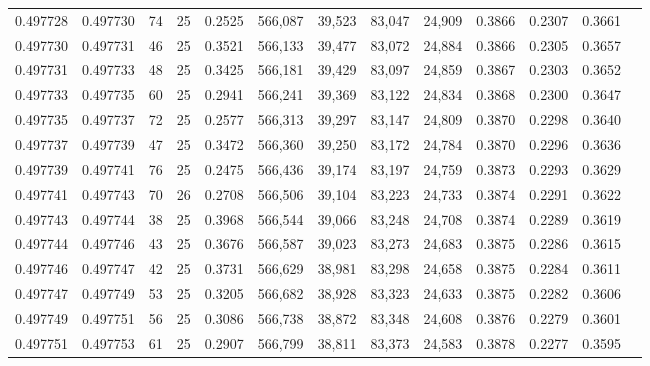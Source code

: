 \begin{tabular}{rrrrrrrrrrrrr}
0.497728 & 0.497730 &    74 &  25 &                                     0.2525 & 566,087 &  39,523 &  83,047 &  24,909 & 0.3866 & 0.2307 & 0.3661 \\
0.497730 & 0.497731 &    46 &  25 &                                     0.3521 & 566,133 &  39,477 &  83,072 &  24,884 & 0.3866 & 0.2305 & 0.3657 \\
0.497731 & 0.497733 &    48 &  25 &                                     0.3425 & 566,181 &  39,429 &  83,097 &  24,859 & 0.3867 & 0.2303 & 0.3652 \\
0.497733 & 0.497735 &    60 &  25 &                                     0.2941 & 566,241 &  39,369 &  83,122 &  24,834 & 0.3868 & 0.2300 & 0.3647 \\
0.497735 & 0.497737 &    72 &  25 &                                     0.2577 & 566,313 &  39,297 &  83,147 &  24,809 & 0.3870 & 0.2298 & 0.3640 \\
0.497737 & 0.497739 &    47 &  25 &                                     0.3472 & 566,360 &  39,250 &  83,172 &  24,784 & 0.3870 & 0.2296 & 0.3636 \\
0.497739 & 0.497741 &    76 &  25 &                                     0.2475 & 566,436 &  39,174 &  83,197 &  24,759 & 0.3873 & 0.2293 & 0.3629 \\
0.497741 & 0.497743 &    70 &  26 &                                     0.2708 & 566,506 &  39,104 &  83,223 &  24,733 & 0.3874 & 0.2291 & 0.3622 \\
0.497743 & 0.497744 &    38 &  25 &                                     0.3968 & 566,544 &  39,066 &  83,248 &  24,708 & 0.3874 & 0.2289 & 0.3619 \\
0.497744 & 0.497746 &    43 &  25 &                                     0.3676 & 566,587 &  39,023 &  83,273 &  24,683 & 0.3875 & 0.2286 & 0.3615 \\
0.497746 & 0.497747 &    42 &  25 &                                     0.3731 & 566,629 &  38,981 &  83,298 &  24,658 & 0.3875 & 0.2284 & 0.3611 \\
0.497747 & 0.497749 &    53 &  25 &                                     0.3205 & 566,682 &  38,928 &  83,323 &  24,633 & 0.3875 & 0.2282 & 0.3606 \\
0.497749 & 0.497751 &    56 &  25 &                                     0.3086 & 566,738 &  38,872 &  83,348 &  24,608 & 0.3876 & 0.2279 & 0.3601 \\
0.497751 & 0.497753 &    61 &  25 &                                     0.2907 & 566,799 &  38,811 &  83,373 &  24,583 & 0.3878 & 0.2277 & 0.3595 \\

\end{tabular}
